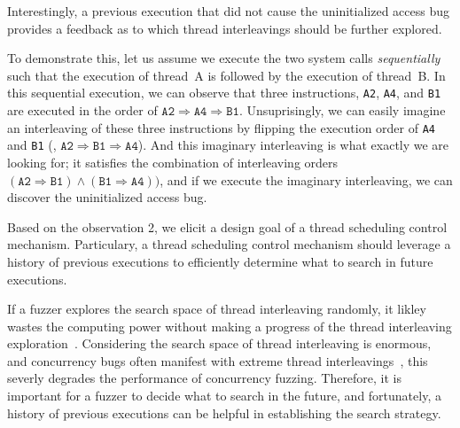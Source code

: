

%
Interestingly, a previous execution that did not cause the
uninitialized access bug provides a feedback as to which thread
interleavings should be further explored.

To demonstrate this, let us assume we execute the two system calls
\textit{sequentially} such that the execution of thread~A is followed
by the execution of thread~B.
%
In this sequential execution, we can observe that three instructions,
\texttt{A2}, \texttt{A4}, and \texttt{B1} are executed in the order of
$\texttt{A2} \Rightarrow \texttt{A4} \Rightarrow \texttt{B1}$.
%
Unsuprisingly, we can easily imagine an interleaving of these three
instructions by flipping the execution order of \texttt{A4} and
\texttt{B1} (\ie,
$\texttt{A2} \Rightarrow \texttt{B1} \Rightarrow \texttt{A4}$).
%
And this imaginary interleaving is what exactly we are looking for; it
satisfies the combination of interleaving orders
$(\texttt{A2} \Rightarrow \texttt{B1}) \wedge (\texttt{B1} \Rightarrow
\texttt{A4}))$, and if we execute the imaginary interleaving, we can
discover the uninitialized access bug.



%
Based on the observation 2, we elicit a design goal of a thread
scheduling control mechanism.
%
Particulary, a thread scheduling control mechanism should leverage a
history of previous executions to efficiently determine what to search
in future executions.


If a fuzzer explores the search space of thread interleaving randomly,
it likley wastes the computing power without making a progress of the
thread interleaving exploration~\cite{covcon,
  terragni2018effectiveness}.
%
Considering the search space of thread interleaving is enormous, and
concurrency bugs often manifest with extreme thread
interleavings~\cite{cve20196974, cve20191999, cve201911486}, this
severly degrades the performance of concurrency fuzzing.
%
Therefore, it is important for a fuzzer to decide what to search in
the future, and fortunately, a history of previous executions can be
helpful in establishing the search strategy.





